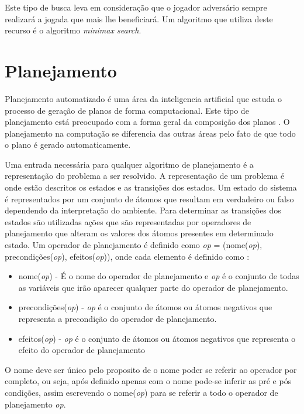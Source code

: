 Este tipo de busca leva em consideração que o jogador adversário sempre realizará a jogada que mais lhe beneficiará. Um algoritmo que utiliza deste recurso é o algoritmo \textit{minimax search}.


\section{Planejamento} 
Planejamento automatizado é uma área da inteligencia artificial que estuda o processo de geração de planos de forma computacional. Este tipo de planejamento está preocupado com a forma geral da composição dos planos \cite{ghallab2004automated}. O planejamento na computação se diferencia das outras áreas pelo fato de que todo o plano é gerado automaticamente. 

Uma entrada necessária para qualquer algoritmo de planejamento é a representação do problema a ser resolvido. A representação de um problema é onde estão descritos os estados e as transições dos estados. Um estado do sistema é representados por um conjunto de átomos que resultam em verdadeiro ou falso dependendo da interpretação do ambiente. Para determinar as transições dos estados são utilizadas ações que são  representadas por operadores de planejamento que alteram os valores dos átomos presentes em determinado estado. Um operador de planejamento é definido como \textit{op} = (nome(\textit{op}), precondições(\textit{op}), efeitos(\textit{op})), onde cada elemento é definido como \cite{ghallab2004automated}: 

\begin{itemize}
	\item nome(\textit{op}) - É o nome do operador de planejamento e \textit{op} é o conjunto de todas as variáveis que irão aparecer qualquer parte do operador de planejamento.  
	\item precondições(\textit{op}) - \textit{op} é o conjunto de átomos ou átomos negativos que representa a precondição do operador de planejamento. 
	\item efeitos(\textit{op}) - \textit{op} é o conjunto de átomos ou átomos negativos que representa o efeito do operador de planejamento
\end{itemize}

O nome deve ser único pelo proposito de o nome poder se referir ao operador por completo, ou seja, após definido apenas com o nome pode-se inferir as pré e pós condições, assim escrevendo o nome(\textit{op}) para se referir a todo o operador de planejamento \textit{op}. 

